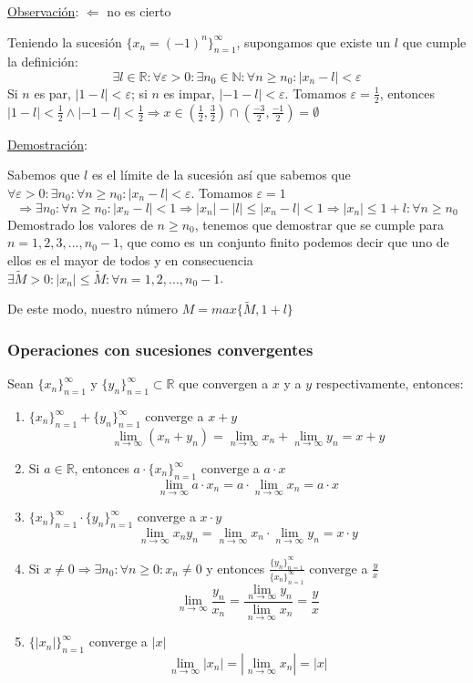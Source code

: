 \documentclass[10pt,a4paper,openright]{book}
\begin{document}
\underline{Observación}: $\Leftarrow$ no es cierto\par
Teniendo la sucesión $\{x_n=(-1)^n\}_{n=1}^\infty$, supongamos que existe un $l$ que cumple la definición:
$$\exists l \in \mathbb R: \forall \varepsilon>0: \exists n_0\in \mathbb N: \forall n\geq n_0: |x_n-l|<\varepsilon$$
Si $n$ es par, $|1-l|<\varepsilon$; si $n$ es impar, $|-1-l|<\varepsilon$. Tomamos $\varepsilon=\frac{1}{2}$, entonces $|1-l|<\frac{1}{2} \wedge |-1-l|<\frac{1}{2}\Rightarrow x\in (\frac{1}{2}, \frac{3}{2})\cap (\frac{-3}{2}, \frac{-1}{2})=\emptyset$\par

\underline{Demostración}:\par
Sabemos que $l$ es el límite de la sucesión así que sabemos que $\forall \varepsilon>0: \exists n_0: \forall n\geq n_0: |x_n-l|<\varepsilon$. Tomamos $\varepsilon=1$
$$\Rightarrow \exists n_0: \forall n\geq n_0: |x_n-l|<1\Rightarrow |x_n|-|l|\leq |x_n-l|<1\Rightarrow |x_n|\leq 1+l: \forall n\geq n_0$$
Demostrado los valores de $n\geq n_0$, tenemos que demostrar que se cumple para $n=1,2,3,...,n_0-1$, que como es un conjunto finito podemos decir que uno de ellos es el mayor de todos y en consecuencia $\exists \tilde{M}>0: |x_n|\leq \tilde{M}: \forall n=1,2,..., n_0-1$.\par
De este modo, nuestro número $M=max\{\tilde{M}, 1+l\}$

\subsubsection*{Operaciones con sucesiones convergentes}
Sean $\{x_n\}_{n=1}^\infty$ y $\{y_n\}_{n=1}^\infty \subset \mathbb R$ que convergen a $x$ y a $y$ respectivamente, entonces:
\begin{enumerate}
\item $\{x_n\}_{n=1}^\infty+\{y_n\}_{n=1}^\infty$ converge a $x+y$
$$\lim_{n\rightarrow \infty}(x_n+y_n)=\lim_{n\rightarrow \infty} x_n + \lim_{n\rightarrow \infty} y_n = x+y$$

\item Si $a\in \mathbb R$, entonces $a\cdot \{x_n\}_{n=1}^\infty$ converge a $a\cdot x$
$$\lim_{n\rightarrow \infty} a\cdot x_n=a\cdot \lim_{n\rightarrow \infty} x_n=a \cdot x$$

\item $\{x_n\}_{n=1}^\infty\cdot \{y_n\}_{n=1}^\infty$ converge a $x\cdot y$
$$\lim_{n\rightarrow \infty} x_n y_n= \lim_{n\rightarrow \infty} x_n \cdot \lim_{n\rightarrow \infty} y_n= x\cdot y$$

\item Si $x\neq 0\Rightarrow \exists n_0: \forall n\geq 0: x_n\neq 0$ y entonces $\frac{\{y_n\}_{n=1}^\infty}{\{x_n\}_{n=1}^\infty}$ converge a $\frac{y}{x}$
$$\lim_{n\rightarrow \infty}\frac{y_n}{x_n}=\frac{\lim_{n\rightarrow \infty} y_n}{\lim_{n\rightarrow \infty} x_n}=\frac{y}{x}$$

\item $\{|x_n|\}_{n=1}^\infty$ converge a $|x|$
$$\lim_{n\rightarrow \infty} |x_n|=|\lim_{n\rightarrow \infty} x_n|=|x|$$
\end{enumerate}
\end{document}
